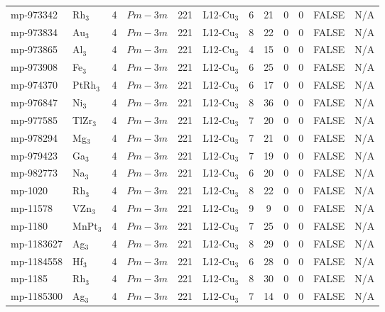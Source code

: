 {\begin{longtable}{llcccccccccc}
    mp-973342 & Rh$_{3}$ & 4     & $Pm-3m$ & 221   & L12-Cu$_{3}$ & 6     & 21    & 0     & 0     & FALSE & N/A \\
    mp-973834 & Au$_{3}$ & 4     & $Pm-3m$ & 221   & L12-Cu$_{3}$ & 8     & 22    & 0     & 0     & FALSE & N/A \\
    mp-973865 & Al$_{3}$ & 4     & $Pm-3m$ & 221   & L12-Cu$_{3}$ & 4     & 15    & 0     & 0     & FALSE & N/A \\
    mp-973908 & Fe$_{3}$ & 4     & $Pm-3m$ & 221   & L12-Cu$_{3}$ & 6     & 25    & 0     & 0     & FALSE & N/A \\
    mp-974370 & PtRh$_{3}$ & 4     & $Pm-3m$ & 221   & L12-Cu$_{3}$ & 6     & 17    & 0     & 0     & FALSE & N/A \\
    mp-976847 & Ni$_{3}$ & 4     & $Pm-3m$ & 221   & L12-Cu$_{3}$ & 8     & 36    & 0     & 0     & FALSE & N/A \\
    mp-977585 & TlZr$_{3}$ & 4     & $Pm-3m$ & 221   & L12-Cu$_{3}$ & 7     & 20    & 0     & 0     & FALSE & N/A \\
    mp-978294 & Mg$_{3}$ & 4     & $Pm-3m$ & 221   & L12-Cu$_{3}$ & 7     & 21    & 0     & 0     & FALSE & N/A \\
    mp-979423 & Ga$_{3}$ & 4     & $Pm-3m$ & 221   & L12-Cu$_{3}$ & 7     & 19    & 0     & 0     & FALSE & N/A \\
    mp-982773 & Na$_{3}$ & 4     & $Pm-3m$ & 221   & L12-Cu$_{3}$ & 6     & 20    & 0     & 0     & FALSE & N/A \\
    mp-1020 & Rh$_{3}$ & 4     & $Pm-3m$ & 221   & L12-Cu$_{3}$ & 8     & 22    & 0     & 0     & FALSE & N/A \\
    mp-11578 & VZn$_{3}$ & 4     & $Pm-3m$ & 221   & L12-Cu$_{3}$ & 9     & 9     & 0     & 0     & FALSE & N/A \\
    mp-1180 & MnPt$_{3}$ & 4     & $Pm-3m$ & 221   & L12-Cu$_{3}$ & 7     & 25    & 0     & 0     & FALSE & N/A \\
    mp-1183627 & Ag$_{3}$ & 4     & $Pm-3m$ & 221   & L12-Cu$_{3}$ & 8     & 29    & 0     & 0     & FALSE & N/A \\
    mp-1184558 & Hf$_{3}$ & 4     & $Pm-3m$ & 221   & L12-Cu$_{3}$ & 6     & 28    & 0     & 0     & FALSE & N/A \\
    mp-1185 & Rh$_{3}$ & 4     & $Pm-3m$ & 221   & L12-Cu$_{3}$ & 8     & 30    & 0     & 0     & FALSE & N/A \\
    mp-1185300 & Ag$_{3}$ & 4     & $Pm-3m$ & 221   & L12-Cu$_{3}$ & 7     & 14    & 0     & 0     & FALSE & N/A \\

\end{longtable}}
